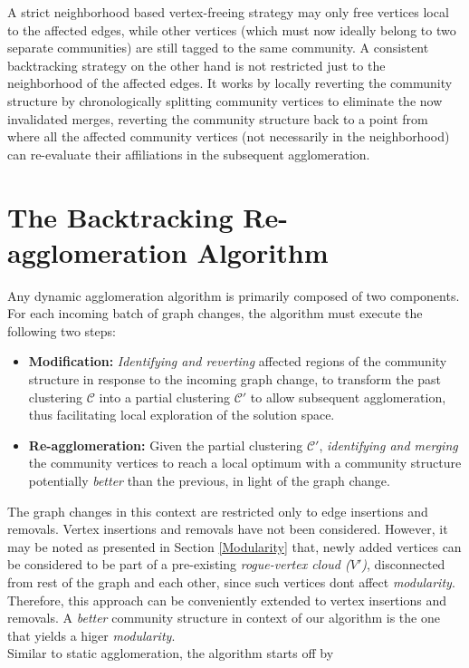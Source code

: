 \documentclass[conference]{IEEEtran}
\begin{document}
A strict neighborhood based vertex-freeing strategy may only free vertices 
local to the affected edges, while other vertices (which must now ideally 
belong to two separate communities) are still tagged to the same community. A 
consistent backtracking strategy on the other hand is not restricted just to 
the neighborhood of the affected edges. It works by locally reverting the 
community structure by chronologically splitting community vertices to 
eliminate the now invalidated merges, reverting the community structure back to 
a point from where all the affected community vertices (not necessarily in the 
neighborhood) can re-evaluate their affiliations in the subsequent 
agglomeration.

\section{The Backtracking Re-agglomeration Algorithm}
Any dynamic agglomeration algorithm is primarily composed of two components. 
For each incoming batch of graph changes, the algorithm must execute the 
following two steps:
\begin{itemize}
 \item \textbf{Modification:} \emph{Identifying and reverting} affected 
regions of the community structure in response to the incoming graph change, to 
transform the past clustering $\mathcal{C}$ into a partial clustering 
$\mathcal{C'}$ to allow subsequent agglomeration, thus facilitating local 
exploration of the solution space.
\item \textbf{Re-agglomeration:} Given the partial clustering $\mathcal{C'}$, 
\emph{identifying and merging} the community vertices to reach a local optimum 
with 
a community structure potentially \emph{better} than the previous, in light of 
the graph change.
\end{itemize}
The graph changes in this context are restricted only to edge insertions and 
removals. Vertex insertions and removals have not been considered. However, it 
may be noted as presented in Section \ref{Modularity} that, newly added 
vertices can be considered to be part of a pre-existing \emph{rogue-vertex 
cloud ($V'$)}, disconnected from rest of the graph and each other, since such 
vertices dont affect \emph{modularity}. Therefore, this approach can be 
conveniently extended to vertex insertions and removals. A \emph{better} 
community structure in context of our algorithm is the one that yields a higer 
\emph{modularity}.\\
Similar to static agglomeration, the algorithm starts off by 
\end{document}
